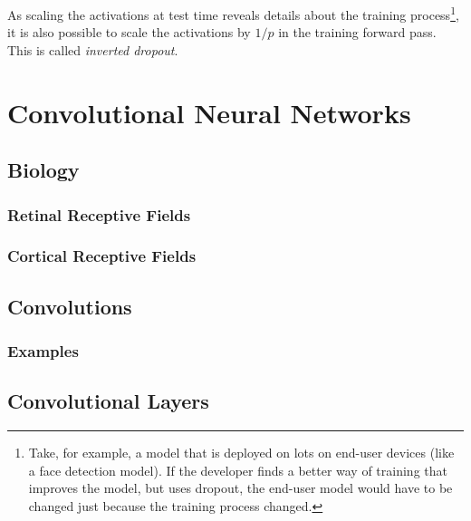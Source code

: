		As scaling the activations at test time reveals details about the training process\footnote{Take, for example, a model that is deployed on lots on end-user devices (like a face detection model). If the developer finds a better way of training that improves the model, but uses dropout, the end-user model would have to be changed just because the training process changed.}, it is also possible to scale the activations by \(1/p\) in the training forward pass. This is called \emph{inverted dropout}.

\chapter{Convolutional Neural Networks} %

	\section{Biology} %

		\subsection{Retinal Receptive Fields} %

		\subsection{Cortical Receptive Fields} %

	\section{Convolutions} %

		\subsection{Examples} %

	\section{Convolutional Layers} %

